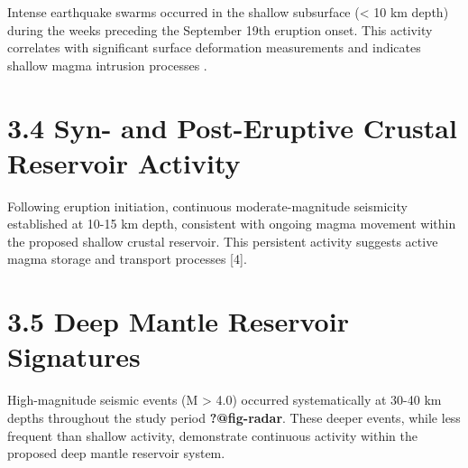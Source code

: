 \documentclass[
  spanish,
  letterpaper,
]{book}
\begin{document}
Intense earthquake swarms occurred in the shallow subsurface
(\textless{} 10 km depth) during the weeks preceding the September 19th
eruption onset. This activity correlates with significant surface
deformation measurements and indicates shallow magma intrusion processes
.

\section{3.4 Syn- and Post-Eruptive Crustal Reservoir
Activity}\label{syn--and-post-eruptive-crustal-reservoir-activity}

Following eruption initiation, continuous moderate-magnitude seismicity
established at 10-15 km depth, consistent with ongoing magma movement
within the proposed shallow crustal reservoir. This persistent activity
suggests active magma storage and transport processes {[}4{]}.

\section{3.5 Deep Mantle Reservoir
Signatures}\label{deep-mantle-reservoir-signatures}

High-magnitude seismic events (M \textgreater{} 4.0) occurred
systematically at 30-40 km depths throughout the study period
\textbf{?@fig-radar}. These deeper events, while less frequent than
shallow activity, demonstrate continuous activity within the proposed
deep mantle reservoir system.
\end{document}
